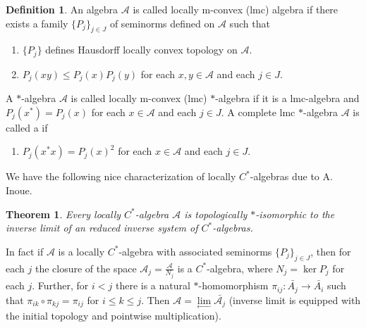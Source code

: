 \documentclass[10pt]{article}
\newtheorem{theorem}{Theorem}[section]
\newcommand{\mA}{\mathcal A}
\theoremstyle{definition}
\newtheorem{definition}{Definition}[section]
\begin{document}
	\begin{definition}
		An algebra $\mathcal A$ is called locally m-convex (lmc) algebra if there exists a family $\{P_j\}_{j\in J}$ of seminorms defined on $\mathcal A$ such that \begin{enumerate}
			\item $\{P_j\}$ defines Hausdorff locally convex topology on $\mA$.
			\item $P_j(xy)\leq P_j(x)P_j(y)$ for each $x,y\in \mA$ and each $j\in J$.
		\end{enumerate}		
	
		A $*$-algebra $\mA$ is called locally m-convex (lmc) $*$-algebra if it is a lmc-algebra and $P_j(x^*)=P_j(x)$ for each $x\in \mA$ and each $j\in J$.	A complete lmc $*$-algebra $\mA$ is called a  if 
		\begin{enumerate}[resume]
			\item $P_j(x^*x)=P_j(x)^2$ for each $x\in\mA$ and each $j\in J$.
		\end{enumerate}
	\end{definition}
	We have the following nice characterization of locally $C^*$-algebras due to A. Inoue.
	\begin{theorem}\label{lcd}
		Every locally $C^*$-algebra $\mathcal A$ is topologically $*$-isomorphic to the inverse limit of an reduced inverse system of $C^*$-algebras. \cite{Inoue}
	\end{theorem}
	In fact if $\mathcal A$ is a locally $C^*$-algebra with associated seminorms $\{P_j\}_{j\in J}$, then for each $j$ the closure of the space ${\mathcal A_j}=\frac{\mathcal A}{N_j}$ is a $C^*$-algebra, where $N_j=\ker P_j$ for each $j$. Further, for $i<j$ there is a natural $*$-homomorphism $\pi_{ij}:\bar{A_j}\to \bar{A_i}$ such that $\pi_{ik}\circ\pi_{kj}=\pi_{ij}$ for $i\leq k\leq j$. Then $\mathcal A=\underset{\longleftarrow}{\lim }\bar{\mathcal A_j}$ (inverse limit is equipped with the initial topology and pointwise multiplication).
	
\end{document}
